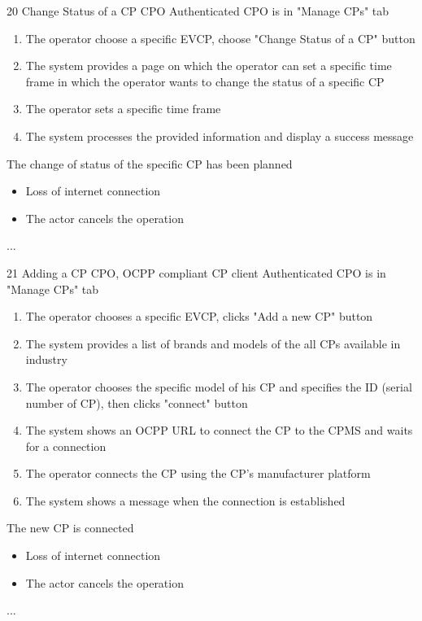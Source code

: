 \usecase
{20}
{Change Status of a CP} %
{CPO} %
{Authenticated CPO is in "Manage CPs" tab} %
{ %
    \begin{enumerate}
        \item The operator choose a specific EVCP, choose "Change Status of a CP" button
        \item The system provides a page on which the operator can set a specific time frame in which the operator wants to change the status of a specific CP
        \item The operator sets a specific time frame
        \item The system processes the provided information and display a success message
    \end{enumerate}
}
{The change of status of the specific CP has been planned} %
{ %
    \begin{itemize}
        \item Loss of internet connection
        \item The actor cancels the operation
    \end{itemize}
}
{ %
    ...
}

\usecase
{21}
{Adding a CP} %
{CPO, OCPP compliant CP client} %
{Authenticated CPO is in "Manage CPs" tab} %
{ %
    \begin{enumerate}
        \item The operator chooses a specific EVCP, clicks "Add a new CP" button
        \item The system provides a list of brands and models of the all CPs available in industry
        \item The operator chooses the specific model of his CP and specifies the ID (serial number of CP), then clicks "connect" button
        \item The system shows an OCPP URL to connect the CP to the CPMS and waits for a connection
        \item The operator connects the CP using the CP's manufacturer platform
        \item The system shows a message when the connection is established
    \end{enumerate}
}
{The new CP is connected} %
{ %
    \begin{itemize}
        \item Loss of internet connection
        \item The actor cancels the operation
    \end{itemize}
}
{ %
    ...
}

